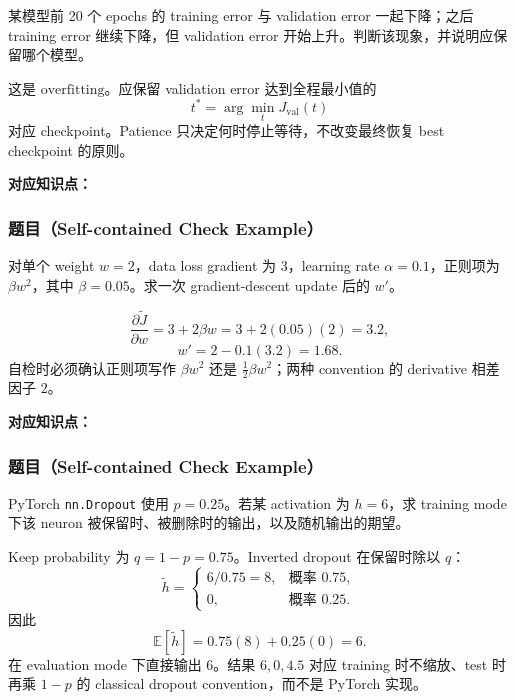 某模型前 20 个 epochs 的 training error 与 validation error 一起下降；之后 training error 继续下降，但 validation error 开始上升。判断该现象，并说明应保留哪个模型。

\begin{checkedsolution}
这是 $\boxed{\text{overfitting}}$。应保留 validation error 达到全程最小值的
\[
  \boxed{t^*=\arg\min_t J_{\mathrm{val}}(t)}
\]
对应 checkpoint。Patience 只决定何时停止等待，不改变最终恢复 best checkpoint 的原则。
\end{checkedsolution}


\textbf{对应知识点：}

\subsubsection*{题目（Self-contained Check Example）}

对单个 weight $w=2$，data loss gradient 为 $3$，learning rate $\alpha=0.1$，正则项为 $\beta w^2$，其中 $\beta=0.05$。求一次 gradient-descent update 后的 $w'$。

\begin{checkedsolution}
\[
  \frac{\partial\widetilde J}{\partial w}
  =3+2\beta w
  =3+2(0.05)(2)
  =3.2,
\]
\[
  \boxed{w'=2-0.1(3.2)=1.68}.
\]
自检时必须确认正则项写作 $\beta w^2$ 还是 $\tfrac12\beta w^2$；两种 convention 的 derivative 相差因子 $2$。
\end{checkedsolution}


\textbf{对应知识点：}

\subsubsection*{题目（Self-contained Check Example）}

PyTorch \texttt{nn.Dropout} 使用 $p=0.25$。若某 activation 为 $h=6$，求 training mode 下该 neuron 被保留时、被删除时的输出，以及随机输出的期望。

\begin{checkedsolution}
Keep probability 为 $q=1-p=0.75$。Inverted dropout 在保留时除以 $q$：
\[
  \widetilde h=
  \begin{cases}
    6/0.75=\boxed{8}, & \text{概率 }0.75,\\
    \boxed{0}, & \text{概率 }0.25.
  \end{cases}
\]
因此
\[
  \boxed{\mathbb E[\widetilde h]=0.75(8)+0.25(0)=6}.
\]
在 evaluation mode 下直接输出 $6$。结果 $6,0,4.5$ 对应 training 时不缩放、test 时再乘 $1-p$ 的 classical dropout convention，而不是 PyTorch 实现。
\end{checkedsolution}
